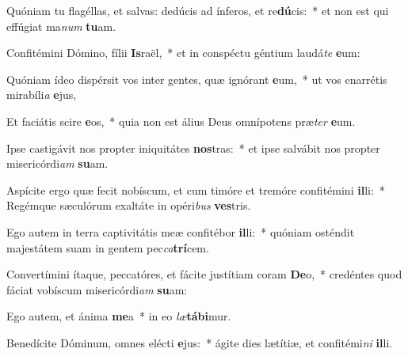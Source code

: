\item Quóniam tu flagéllas, et salvas: dedúcis ad ínferos, et re\textbf{dú}cis:~* et non est qui effúgiat ma\textit{num} \textbf{tu}am.
\item Confitémini Dómino, fílii \textbf{Is}raël,~* et in conspéctu géntium laudá\textit{te} \textbf{e}um:
\item Quóniam ídeo dispérsit vos inter gentes, quæ ignórant \textbf{e}um,~* ut vos enarrétis mirabíli\textit{a} \textbf{e}jus,
\item Et faciátis scire \textbf{e}os,~* quia non est álius Deus omnípotens præ\textit{ter} \textbf{e}um.
\item Ipse castigávit nos propter iniquitátes \textbf{nos}tras:~* et ipse salvábit nos propter misericórdi\textit{am} \textbf{su}am.
\item Aspícite ergo quæ fecit nobíscum, et cum timóre et tremóre confitémini \textbf{il}li:~* Regémque sæculórum exaltáte in opéri\textit{bus} \textbf{ves}tris.
\item Ego autem in terra captivitátis meæ confitébor \textbf{il}li:~* quóniam osténdit majestátem suam in gentem pec\textit{ca}\textbf{trí}cem.
\item Convertímini ítaque, peccatóres, et fácite justítiam coram \textbf{De}o,~* credéntes quod fáciat vobíscum misericórdi\textit{am} \textbf{su}am:
\item Ego autem, et ánima \textbf{me}a~* in eo \textit{læ}\textbf{tá}\textbf{bi}mur.
\item Benedícite Dóminum, omnes elécti \textbf{e}jus:~* ágite dies lætítiæ, et confitémi\textit{ni} \textbf{il}li.
